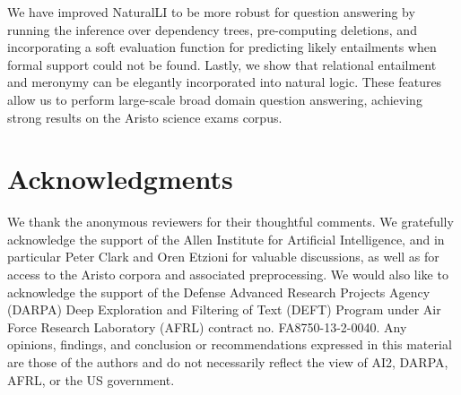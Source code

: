 We have improved NaturalLI to be more
  robust for question answering by running the inference over dependency trees,
  pre-computing deletions, and incorporating a soft evaluation function for 
  predicting likely entailments when formal support could not be found.
Lastly, we show that relational entailment and meronymy can be elegantly incorporated
  into natural logic.
These features allow us to perform large-scale broad domain question answering,
  achieving strong results on the Aristo science exams corpus.


\section*{Acknowledgments}
We thank the anonymous reviewers for their
  thoughtful comments. 
We gratefully acknowledge the support of the Allen Institute
  for Artificial Intelligence, and in particular Peter Clark and
  Oren Etzioni for
  valuable discussions, as well as for access to the Aristo corpora
  and associated preprocessing.
We would also like to acknowledge the support of the 
  Defense Advanced Research Projects Agency (DARPA) Deep Exploration
  and Filtering of Text (DEFT) Program under
  Air Force Research Laboratory (AFRL) contract
  no. FA8750-13-2-0040. 
Any opinions, findings, and conclusion or recommendations expressed
  in this material are those of the authors and
  do not necessarily reflect the view of AI2, DARPA,
  AFRL, or the US government.

